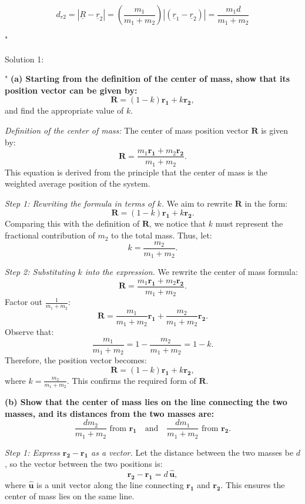 \[ d_{r2} = | \underline{R} - \underline{r}_2 | = \left( \frac{m_1}{m_1+m_2} \right )|(\underline{r}_1 - \underline{r}_2) | = \frac{m_1 d}{m_1+m_2} \]

"

Solution 1:

"
\textbf{(a) Starting from the definition of the center of mass, show that its position vector can be given by:}
\[
\mathbf{R} = (1 - k)\mathbf{r_1} + k\mathbf{r_2},
\]
and find the appropriate value of $k$.

\textit{Definition of the center of mass:}
The center of mass position vector $\mathbf{R}$ is given by:
\[
\mathbf{R} = \frac{m_1 \mathbf{r_1} + m_2 \mathbf{r_2}}{m_1 + m_2}.
\]
This equation is derived from the principle that the center of mass is the weighted average position of the system.

\textit{Step 1: Rewriting the formula in terms of $k$.}  
We aim to rewrite $\mathbf{R}$ in the form:
\[
\mathbf{R} = (1 - k)\mathbf{r_1} + k\mathbf{r_2}.
\]
Comparing this with the definition of $\mathbf{R}$, we notice that $k$ must represent the fractional contribution of $m_2$ to the total mass. Thus, let:
\[
k = \frac{m_2}{m_1 + m_2}.
\]

\textit{Step 2: Substituting $k$ into the expression.}  
We rewrite the center of mass formula:
\[
\mathbf{R} = \frac{m_1 \mathbf{r_1} + m_2 \mathbf{r_2}}{m_1 + m_2}.
\]
Factor out $\frac{1}{m_1 + m_2}$:
\[
\mathbf{R} = \frac{m_1}{m_1 + m_2} \mathbf{r_1} + \frac{m_2}{m_1 + m_2} \mathbf{r_2}.
\]
Observe that:
\[
\frac{m_1}{m_1 + m_2} = 1 - \frac{m_2}{m_1 + m_2} = 1 - k.
\]
Therefore, the position vector becomes:
\[
\mathbf{R} = (1 - k)\mathbf{r_1} + k\mathbf{r_2},
\]
where $k = \frac{m_2}{m_1 + m_2}$. This confirms the required form of $\mathbf{R}$.

\vspace{0.5cm}
\textbf{(b) Show that the center of mass lies on the line connecting the two masses, and its distances from the two masses are:}
\[
\frac{d m_2}{m_1 + m_2} \text{ from } \mathbf{r_1} \quad \text{and} \quad \frac{d m_1}{m_1 + m_2} \text{ from } \mathbf{r_2}.
\]

\textit{Step 1: Express $\mathbf{r_2} - \mathbf{r_1}$ as a vector.}  
Let the distance between the two masses be $d$, so the vector between the two positions is:
\[
\mathbf{r_2} - \mathbf{r_1} = d \, \hat{\mathbf{u}},
\]
where $\hat{\mathbf{u}}$ is a unit vector along the line connecting $\mathbf{r_1}$ and $\mathbf{r_2}$. This ensures the center of mass lies on the same line.

